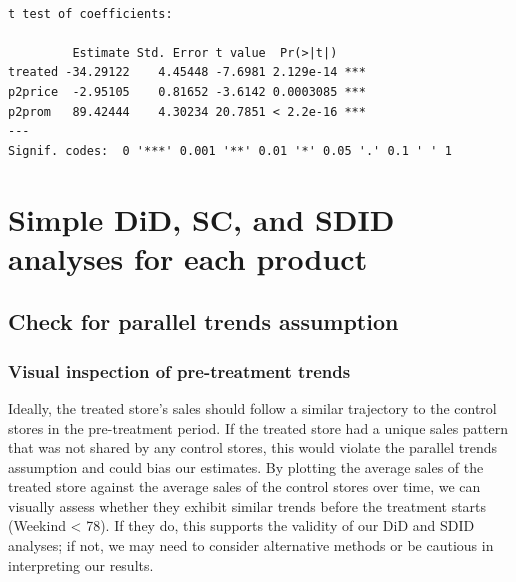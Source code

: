 \documentclass[
  letterpaper,
  DIV=11,
  numbers=noendperiod]{scrartcl}
\begin{document}
\begin{verbatim}

t test of coefficients:

         Estimate Std. Error t value  Pr(>|t|)    
treated -34.29122    4.45448 -7.6981 2.129e-14 ***
p2price  -2.95105    0.81652 -3.6142 0.0003085 ***
p2prom   89.42444    4.30234 20.7851 < 2.2e-16 ***
---
Signif. codes:  0 '***' 0.001 '**' 0.01 '*' 0.05 '.' 0.1 ' ' 1
\end{verbatim}

\section{Simple DiD, SC, and SDID analyses for each
product}\label{simple-did-sc-and-sdid-analyses-for-each-product}

\subsection{Check for parallel trends
assumption}\label{check-for-parallel-trends-assumption}

\subsubsection{Visual inspection of pre-treatment
trends}\label{visual-inspection-of-pre-treatment-trends}

Ideally, the treated store's sales should follow a similar trajectory to
the control stores in the pre-treatment period. If the treated store had
a unique sales pattern that was not shared by any control stores, this
would violate the parallel trends assumption and could bias our
estimates. By plotting the average sales of the treated store against
the average sales of the control stores over time, we can visually
assess whether they exhibit similar trends before the treatment starts
(Weekind \textless{} 78). If they do, this supports the validity of our
DiD and SDID analyses; if not, we may need to consider alternative
methods or be cautious in interpreting our results.
\end{document}
